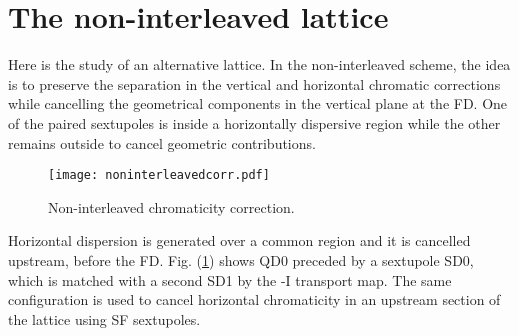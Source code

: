 \section{The non-interleaved lattice}
Here is the study of an alternative lattice. In the non-interleaved scheme, the idea is to preserve the separation in the vertical and horizontal chromatic corrections  while cancelling the geometrical components in the vertical plane at the FD. One of the paired sextupoles is inside a horizontally dispersive region while the other remains outside to cancel geometric contributions.\par
\begin{figure}[!htb]
   \centering
   \texttt{[image: noninterleavedcorr.pdf]}
   \caption{Non-interleaved chromaticity correction.}
   \label{f-noninterleaved}
\end{figure}
 Horizontal dispersion is generated over a common region and it is cancelled upstream, before the FD. Fig. (\ref{f-noninterleaved}) shows QD0 preceded by a sextupole SD0, which is matched with a second SD1 by the -I transport map. The same configuration is used to cancel horizontal chromaticity in an upstream section of the lattice using SF sextupoles.\par

